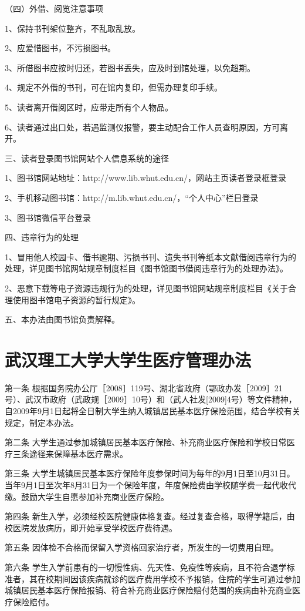 \documentclass[UTF8,12pt,a4paper]{report}
\begin{document}
（四）外借、阅览注意事项

1、保持书刊架位整齐，不乱取乱放。

2、应爱惜图书，不污损图书。

3、所借图书应按时归还，若图书丢失，应及时到馆处理，以免超期。

4、规定不外借的书刊，可在馆内复印，但需办理复印手续。

5、读者离开借阅区时，应带走所有个人物品。

6、读者通过出口处，若遇监测仪报警，要主动配合工作人员查明原因，方可离开。

三、读者登录图书馆网站个人信息系统的途径

1、图书馆网站地址：http://www.lib.whut.edu.cn/，网站主页读者登录框登录

2、手机移动图书馆：http://m.lib.whut.edu.cn/，“个人中心”栏目登录

3、图书馆微信平台登录

四、违章行为的处理

1、冒用他人校园卡、借书逾期、污损书刊、遗失书刊等纸本文献借阅违章行为的处理，详见图书馆网站规章制度栏目《图书馆图书借阅违章行为的处理办法》。

2、恶意下载等电子资源违规行为的处理，详见图书馆网站规章制度栏目《关于合理使用图书馆电子资源的暂行规定》。

五、本办法由图书馆负责解释。

\chapter{武汉理工大学大学生医疗管理办法}
第一条 根据国务院办公厅［2008］119号、湖北省政府（鄂政办发［2009］21号）、武汉市政府（武政规［2009］10号）和（武人社发[2009]4号）等文件精神，自2009年9月1日起将全日制大学生纳入城镇居民基本医疗保险范围，结合学校有关规定，制定本办法。

第二条 大学生通过参加城镇居民基本医疗保险、补充商业医疗保险和学校日常医疗三条途径来保障基本医疗需求。

第三条 大学生城镇居民基本医疗保险年度参保时间为每年的9月1日至10月31日。当年9月1日至次年8月31日为一个保险年度，年度保险费由学校随学费一起代收代缴。鼓励大学生自愿参加补充商业医疗保险。

第四条 新生入学，必须经校医院健康体格复查。经过复查合格，取得学籍后，由校医院发放病历，即开始享受学校医疗费待遇。

第五条 因体检不合格而保留入学资格回家治疗者，所发生的一切费用自理。

第六条 学生入学前患有的一切慢性病、先天性、免疫性等疾病，且不符合退学标准者，其在校期间因该疾病就诊的医疗费用学校不予报销，住院的学生可通过参加城镇居民基本医疗保险报销、符合补充商业医疗保险赔付范围的疾病由补充商业医疗保险赔付。
\end{document}
